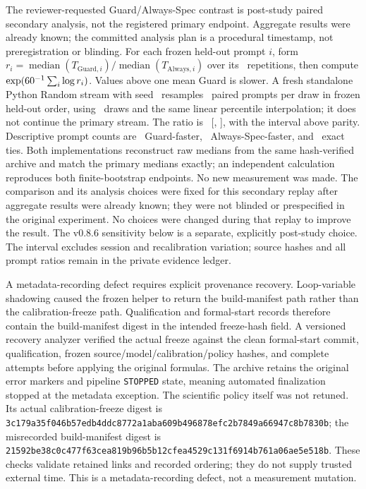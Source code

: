 \documentclass{article}
\begin{document}
The reviewer-requested Guard/Always-Spec contrast is post-study paired secondary analysis, not the registered primary endpoint. Aggregate results were already known; the committed analysis plan is a procedural timestamp, not preregistration or blinding. For each frozen held-out prompt $i$, form $r_i=\operatorname{median}(T_{\mathrm{Guard},i})/\operatorname{median}(T_{\mathrm{Always},i})$ over its \RTReps\ repetitions, then compute $\exp(60^{-1}\sum_i\log r_i)$. Values above one mean Guard is slower. A fresh standalone Python Random stream with seed \RTSeed\ resamples \RTPrompts\ paired prompts per draw in frozen held-out order, using \RTBootstrap\ draws and the same linear percentile interpolation; it does not continue the primary stream. The ratio is \RTSecondary\ [\RTSecondaryLo, \RTSecondaryHi], with the interval above parity. Descriptive prompt counts are \RTGuardFaster\ Guard-faster, \RTAlwaysFaster\ Always-Spec-faster, and \RTTies\ exact ties. Both implementations reconstruct raw medians from the same hash-verified archive and match the primary medians exactly; an independent calculation reproduces both finite-bootstrap endpoints. No new measurement was made. The comparison and its analysis choices were fixed for this secondary replay after aggregate results were already known; they were not blinded or prespecified in the original experiment. No choices were changed during that replay to improve the result. The v0.8.6 sensitivity below is a separate, explicitly post-study choice. The interval excludes session and recalibration variation; source hashes and all prompt ratios remain in the private evidence ledger.

A metadata-recording defect requires explicit provenance recovery. Loop-variable shadowing caused the frozen helper to return the build-manifest path rather than the calibration-freeze path. Qualification and formal-start records therefore contain the build-manifest digest in the intended freeze-hash field. A versioned recovery analyzer verified the actual freeze against the clean formal-start commit, qualification, frozen source/model/calibration/policy hashes, and complete attempts before applying the original formulas. The archive retains the original error markers and pipeline \texttt{STOPPED} state, meaning automated finalization stopped at the metadata exception. The scientific policy itself was not retuned. Its actual calibration-freeze digest is \nolinkurl{3c179a35f046b57edb4ddc8772a1aba609b496878efc2b7849a66947c8b7830b}; the misrecorded build-manifest digest is \nolinkurl{21592be38c0c477f63cea819b96b5b12cfea4529c131f6914b761a06ae5e518b}. These checks validate retained links and recorded ordering; they do not supply trusted external time. This is a metadata-recording defect, not a measurement mutation.
\end{document}
